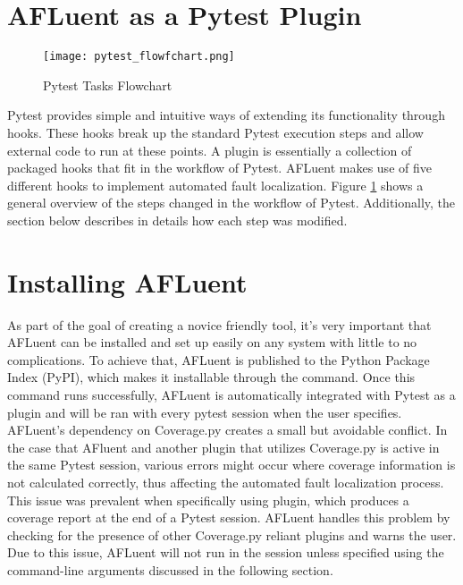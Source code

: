 \section{AFLuent as a Pytest Plugin}
\label{sec:makingPytestPlugin}

\begin{figure}[!htb]
	\begin{center}
		\texttt{[image: pytest\_flowfchart.png]}
		\caption{\label{fig:pytest_flow} Pytest Tasks Flowchart}
	\end{center}
\end{figure}

Pytest provides simple and intuitive ways of extending its functionality through
hooks. These hooks break up the standard Pytest execution steps and allow
external code to run at these points. A plugin is essentially a collection of
packaged hooks that fit in the workflow of Pytest. AFLuent makes use of five
different hooks to implement automated fault localization.
Figure \ref{fig:pytest_flow} shows a general overview of the steps changed in the
workflow of Pytest. Additionally, the section below describes in details how each
step was modified.

\section{Installing AFLuent}
\label{subsec:afluent_install}

As part of the goal of creating a novice friendly tool, it's very important that
AFLuent can be installed and set up easily on any system with little to no
complications. To achieve that, AFLuent is published to the Python Package Index
(PyPI), which makes it installable through the 
command. Once this command runs successfully, AFLuent is automatically
integrated with Pytest as a plugin and will be ran with every pytest session
when the user specifies. AFLuent's dependency on Coverage.py
creates a small but avoidable conflict. In the case that AFluent and another plugin that
utilizes Coverage.py is active in the same Pytest session, various errors might
occur where coverage information is not calculated correctly, thus affecting the
automated fault localization process. This issue was prevalent when specifically
using  plugin, which produces a coverage report at the end of a
Pytest session. AFLuent handles this problem by checking for the presence of
other Coverage.py reliant plugins and warns the user. Due to this issue,
AFLuent will not run in the session unless specified using the
command-line arguments discussed in the following section.

